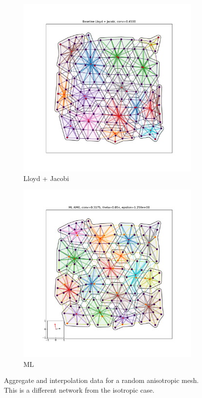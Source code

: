 \documentclass{article}
\begin{document}
\begin{figure}[h]
\begin{subfigure}[t]{0.32\textwidth}
    \includegraphics[width=\textwidth, trim=80 70 70 50, clip]{grid_anis_8_lloyd.pdf}
    \caption{Lloyd + Jacobi}
  \end{subfigure}
  \begin{subfigure}[t]{0.32\textwidth}
    \centering
    \includegraphics[width=\textwidth, trim=80 70 70 50, clip]{grid_anis_8_ml.pdf}
    \caption{ML}
  \end{subfigure}
  \caption{Aggregate and interpolation data for a random anisotropic mesh.  This is a different network from the isotropic case.}
  \label{fig:grid_anis_8}
\end{figure}
\end{document}
